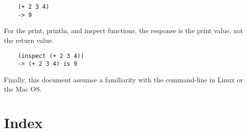 \documentclass{book}
\begin{document}
\begin{verbatim}
    (+ 2 3 4)
    -> 9
\end{verbatim}

For the print, println, and inspect functions, the response
is the print value, not the return value.

\begin{verbatim}
    (inspect (+ 2 3 4))
    -> (+ 2 3 4) is 9
\end{verbatim}

Finally, this document assumse a familiarity with the command-line in
Linux or the Mac OS.
















%
%
%
%
%
%
%
%
%
%

\T\printindex
\W\chapter*{Index}
\W\htmlprintindex
\end{document}
